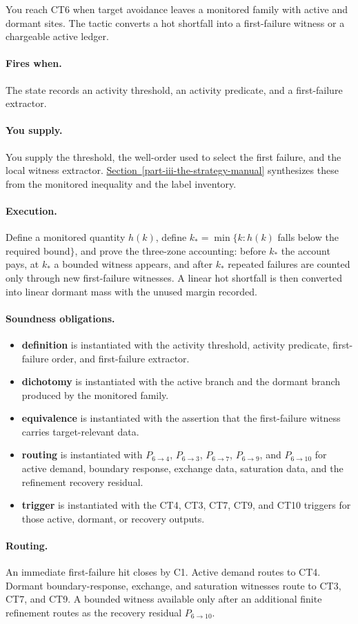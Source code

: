 \documentclass[
  11pt,
]{article}
\providecommand{\tightlist}{%
  \setlength{\itemsep}{0pt}\setlength{\parskip}{0pt}}
\theoremstyle{definition}
\newcommand{\secref}[1]{\hyperref[#1]{Section~\ref*{#1}}}
\newcommand{\ctpar}[1]{\paragraph{#1.}}
\begin{document}
You reach CT6 when target avoidance leaves a monitored family with
active and dormant sites.  The tactic converts a hot shortfall into a
first-failure witness or a chargeable active ledger.

\ctpar{Fires when}
The state records an activity threshold, an activity predicate, and a
first-failure extractor.

\ctpar{You supply}
You supply the threshold, the well-order used to select the first
failure, and the local witness extractor.  \secref{part-iii-the-strategy-manual} synthesizes these
from the monitored inequality and the label inventory.

\ctpar{Execution}
Define a monitored quantity \(h(k)\), define
\(k_*=\min\{k:h(k)\) falls below the required bound\(\}\), and prove the
three-zone accounting: before \(k_*\) the account pays, at \(k_*\) a
bounded witness appears, and after \(k_*\) repeated failures are counted
only through new first-failure witnesses.  A linear hot shortfall is then
converted into linear dormant mass with the unused margin recorded.

\ctpar{Soundness obligations}
\begin{itemize}
\tightlist
\item \textbf{definition} is instantiated with the activity threshold, activity predicate, first-failure order, and first-failure extractor.
\item \textbf{dichotomy} is instantiated with the active branch and the dormant branch produced by the monitored family.
\item \textbf{equivalence} is instantiated with the assertion that the first-failure witness carries target-relevant data.
\item \textbf{routing} is instantiated with \(P_{6\to4}\), \(P_{6\to3}\), \(P_{6\to7}\), \(P_{6\to9}\), and \(P_{6\to10}\) for active demand, boundary response, exchange data, saturation data, and the refinement recovery residual.
\item \textbf{trigger} is instantiated with the CT4, CT3, CT7, CT9, and CT10 triggers for those active, dormant, or recovery outputs.
\end{itemize}

\ctpar{Routing}
An immediate first-failure hit closes by C1.  Active demand routes to
CT4.  Dormant boundary-response, exchange, and saturation witnesses route
to CT3, CT7, and CT9.  A bounded witness available only after an
additional finite refinement routes as the recovery residual
\(P_{6\to10}\).
\end{document}
